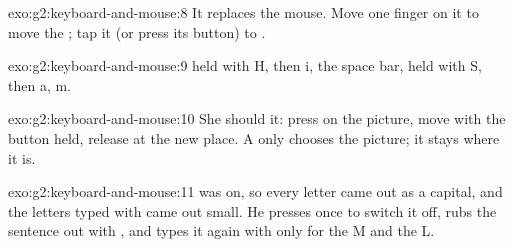 \begin{solution}{exo:g2:keyboard-and-mouse:8}
It replaces the mouse. Move one finger on it to move the ; tap it (or
press its button) to .
\end{solution}

\begin{solution}{exo:g2:keyboard-and-mouse:9}
 held with H, then i, the space bar,  held with S, then
a, m.
\end{solution}

\begin{solution}{exo:g2:keyboard-and-mouse:10}
She should  it: press on the picture, move with the button held, release
at the new place. A  only chooses the picture; it stays where it is.
\end{solution}

\begin{solution}{exo:g2:keyboard-and-mouse:11}
 was on, so every letter came out as a capital, and the letters
typed with  came out small. He presses  once to switch
it off, rubs the sentence out with , and types it again with
 only for the M and the L.
\end{solution}
